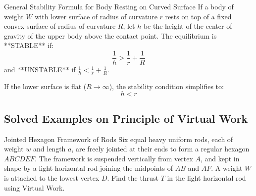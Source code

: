 \documentclass[11pt,a4paper]{article}
\begin{document}
\begin{theorembox}{General Stability Formula for Body Resting on Curved Surface}
If a body of weight $W$ with lower surface of radius of curvature $r$ rests on top of a fixed convex surface of radius of curvature $R$, let $h$ be the height of the center of gravity of the upper body above the contact point.
The equilibrium is **STABLE** if:
\begin{equation}
\frac{1}{h} > \frac{1}{r} + \frac{1}{R}
\end{equation}
and **UNSTABLE** if $\frac{1}{h} < \frac{1}{r} + \frac{1}{R}$.

If the lower surface is flat ($R \to \infty$), the stability condition simplifies to:
\begin{equation}
h < r
\end{equation}
\end{theorembox}

\subsection{Solved Examples on Principle of Virtual Work}

\begin{examplebox}{Jointed Hexagon Framework of Rods}
Six equal heavy uniform rods, each of weight $w$ and length $a$, are freely jointed at their ends to form a regular hexagon $ABCDEF$. The framework is suspended vertically from vertex $A$, and kept in shape by a light horizontal rod joining the midpoints of $AB$ and $AF$. A weight $W$ is attached to the lowest vertex $D$. Find the thrust $T$ in the light horizontal rod using Virtual Work.
\end{examplebox}
\end{document}
